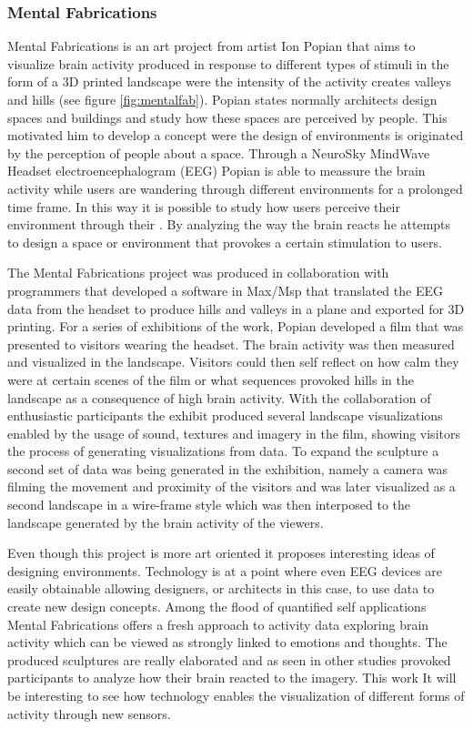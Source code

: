 \documentclass[../medieninformatik-arbeit.tex]{subfiles}
\begin{document}
\subsubsection{Mental Fabrications}
Mental Fabrications is an art project from artist Ion Popian\cite{mental2014fabrications} that aims to visualize brain activity produced in response to different types of stimuli in the form of a 3D printed landscape were the intensity of the activity creates valleys and hills (see figure \ref{fig:mentalfab}). Popian states normally architects design spaces and buildings and study how these spaces are perceived by people. This motivated him to develop a concept were the design of environments is originated by the perception of people about a space. Through a NeuroSky MindWave Headset\cite{nuero2015sky} electroencephalogram (EEG) Popian is able to meassure the brain activity while users are wandering through different environments for a prolonged time frame. In this way it is possible to study how users perceive their environment through their . By analyzing the way the brain reacts he attempts to design a space or environment that provokes a certain stimulation to users.  

The Mental Fabrications project was produced in collaboration with programmers that developed a software in Max/Msp\cite{cylcing2015maxsmp} that translated the EEG data from the headset to produce hills and valleys in a plane and exported for 3D printing.
For a series of exhibitions of the work, Popian developed a film that was presented to visitors wearing the headset. The brain activity was then measured and visualized in the landscape. Visitors could then self reflect on how calm they were at certain scenes of the film or what sequences provoked hills in the landscape as a consequence of high brain activity. With the collaboration of enthusiastic participants the exhibit produced several landscape visualizations enabled by the usage of sound, textures and imagery in the film, showing visitors the process of generating visualizations from data. To expand the sculpture a second set of data was being generated in the exhibition, namely a camera was filming the movement and proximity of the visitors and was later visualized as a second landscape in a wire-frame style which was then interposed to the landscape generated by the brain activity of the viewers.

Even though this project is more art oriented it proposes interesting ideas of designing environments. Technology is at a point where even EEG devices are easily obtainable allowing designers, or architects in this case, to use data to create new design concepts. Among the flood of quantified self applications Mental Fabrications offers a fresh approach to activity data exploring brain activity which can be viewed as strongly linked to emotions and thoughts. The produced sculptures are really elaborated and as seen in other studies provoked participants to analyze how their brain reacted to the imagery. This work It will be interesting to see how technology enables the visualization of different forms of activity through new sensors. 
\end{document}

